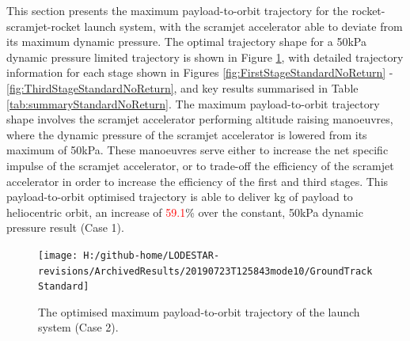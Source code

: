 This section presents the maximum payload-to-orbit trajectory for the rocket-scramjet-rocket launch system, with the scramjet accelerator able to deviate from its maximum dynamic pressure. 
The optimal trajectory shape for a 50kPa dynamic pressure limited trajectory is shown in Figure \ref{fig:GroundTrackStandardNoReturn}, with detailed trajectory information for each stage shown in Figures \ref{fig:FirstStageStandardNoReturn} - \ref{fig:ThirdStageStandardNoReturn}, and key results summarised in Table \ref{tab:summaryStandardNoReturn}. The maximum payload-to-orbit trajectory shape involves the scramjet accelerator performing altitude raising manoeuvres, where the dynamic pressure of the scramjet accelerator is lowered from its maximum of 50kPa. These manoeuvres serve either to increase the net specific impulse of the scramjet accelerator, or to trade-off the efficiency of the scramjet accelerator in order to increase the efficiency of the first and third stages. 
This payload-to-orbit optimised trajectory is able to deliver \PayloadToOrbitStandardNoReturn kg of payload to heliocentric orbit, an increase of \textcolor{red}{59.1}\% over the constant, 50kPa dynamic pressure result (Case 1).

\begin{figure}[ht!]%
	
	
	
	\centering
	\texttt{[image: H:/github-home/LODESTAR-revisions/ArchivedResults/20190723T125843mode10/GroundTrackStandard]}
	\caption{The optimised maximum payload-to-orbit trajectory of the launch system (Case 2).}
	\label{fig:GroundTrackStandardNoReturn}
\end{figure}



